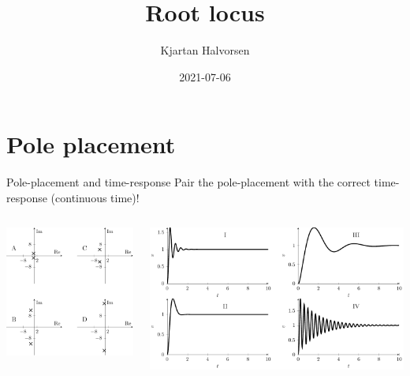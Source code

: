 \documentclass[presentation,aspectratio=169]{beamer}
\author{Kjartan Halvorsen}
\date{2021-07-06}
\title{Root locus}
\begin{document}
\maketitle

\section{Pole placement}
\label{sec:org19bdda3}
\begin{frame}[label={sec:orgca7ea5b}]{Pole-placement and time-response}
\alert{Pair the pole-placement with the correct time-response (continuous time)!}
\begin{columns}
\begin{column}{0.4\columnwidth}
\begin{center}
\includegraphics[width=\linewidth]{../../figures/pzmap-apollo}
\end{center}
\end{column}
\begin{column}{0.6\columnwidth}
\begin{center}
\includegraphics[width=\linewidth]{../../figures/step-response-apollo}
\end{center}
\end{column}
\end{columns}
\end{frame}
\end{document}
